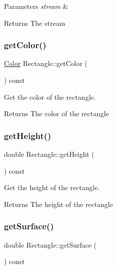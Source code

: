 \begin{DoxyParams}{Parameters}
{\em stream} & \\
\hline
\end{DoxyParams}
\begin{DoxyReturn}{Returns}
The stream 
\end{DoxyReturn}
\mbox{\label{classRectangle_a9bd050cc586a325ed98c83245bb7b7e6}} 
\subsubsection{\texorpdfstring{get\+Color()}{getColor()}}
{\footnotesize\ttfamily \hyperlink{classColor}{Color} Rectangle\+::get\+Color (\begin{DoxyParamCaption}{ }\end{DoxyParamCaption}) const}



Get the color of the rectangle. 

\begin{DoxyReturn}{Returns}
The color of the rectangle 
\end{DoxyReturn}
\mbox{\label{classRectangle_ae2fb8da7f67a36a80d8f789eec63a074}} 
\subsubsection{\texorpdfstring{get\+Height()}{getHeight()}}
{\footnotesize\ttfamily double Rectangle\+::get\+Height (\begin{DoxyParamCaption}{ }\end{DoxyParamCaption}) const}



Get the height of the rectangle. 

\begin{DoxyReturn}{Returns}
The height of the rectangle 
\end{DoxyReturn}
\mbox{\label{classRectangle_addf6cfd9097d92677f6a76f591b88e22}} 
\subsubsection{\texorpdfstring{get\+Surface()}{getSurface()}}
{\footnotesize\ttfamily double Rectangle\+::get\+Surface (\begin{DoxyParamCaption}{ }\end{DoxyParamCaption}) const}



